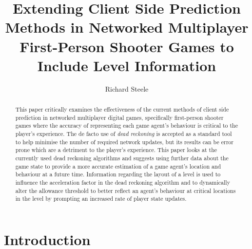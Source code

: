 \documentclass[journal]{IEEEtran}
\begin{document}
%
\title{Extending Client Side Prediction Methods in Networked Multiplayer First-Person Shooter Games to Include Level Information}
%
%
\author{Richard Steele}


\maketitle

\begin{abstract}
This paper critically examines the effectiveness of the current methods of client side prediction in networked multiplayer digital games, specifically first-person shooter games where the accuracy of representing each game agent's behaviour is critical to the player's experience. The de facto use of \textit{dead reckoning} is accepted as a standard tool to help minimise the number of required network updates, but its results can be error prone which are a detriment to the player's experience. This paper looks at the currently used dead reckoning algorithms and suggests using further data about the game state to provide a more accurate estimation of a game agent's location and behaviour at a future time. Information regarding the layout of a level is used to influence the acceleration factor in the dead reckoning algorithm and to dynamically alter the allowance threshold to better reflect an agent's behaviour at critical locations in the level by prompting an increased rate of player state updates.
\end{abstract}

\section{Introduction}
% 
% 
% 
\end{document}
